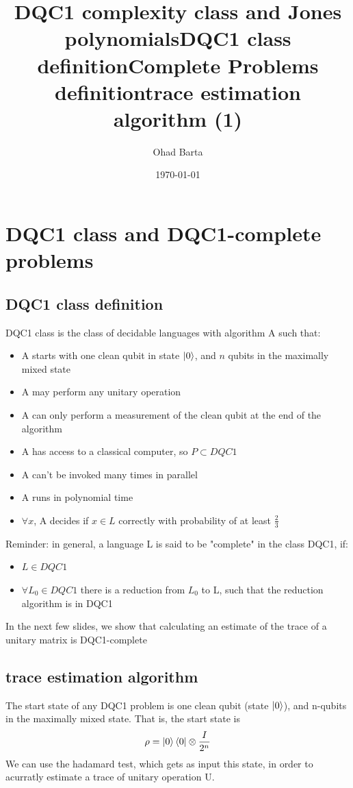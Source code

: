 \documentclass{article}
\begin{document}
\title{DQC1 complexity class and Jones polynomials} 
\author{Ohad Barta} 
\date{\today} 

\titlepage
\tableofcontents



\section{DQC1 class and DQC1-complete problems}
\subsection{DQC1 class definition  } 
\title{DQC1 class definition} 
DQC1 class is the class of decidable languages with algorithm A such that:
\begin{itemize}
\item A starts with one clean qubit in state \(\left\vert{0}\right\rangle\), and $n$ qubits in the maximally mixed state
\item A may perform any unitary operation
\item A can only perform a measurement of the clean qubit at the end of the algorithm
\item A has access to a classical computer, so \(P \subset DQC1\) 
\item A can't be invoked many times in parallel
\item A runs in polynomial time
\item \(\forall x\), A decides if \(x \in L\) correctly with probability of at least \(\frac{2}{3}\)
\end{itemize}


\title{Complete Problems definition} 
Reminder: in general, a language L is said to be "complete" in the class DQC1, if:
\begin{itemize}
\item \(L \in DQC1\)
\item \(\forall L_{0} \in DQC1\) there is a reduction from \(L_{0}\) to L, such that the reduction algorithm is in DQC1  
\end{itemize}
In the next few slides, we show that calculating an estimate of the trace of a unitary matrix is DQC1-complete


\subsection{trace estimation algorithm  }
\title{trace estimation algorithm (1)}
The start state of any DQC1 problem is one clean qubit (state \(\left\vert{0}\right\rangle\)), and n-qubits in the maximally mixed state.
That is, the start state is \begin{equation}
\rho = \left\vert{0}\right\rangle\left\langle{0}\right\vert\otimes\frac{I}{2^n}
\end{equation}
We can use the hadamard test, which gets as input this state, in order to acurratly estimate a trace
of unitary operation U.
\end{document}
